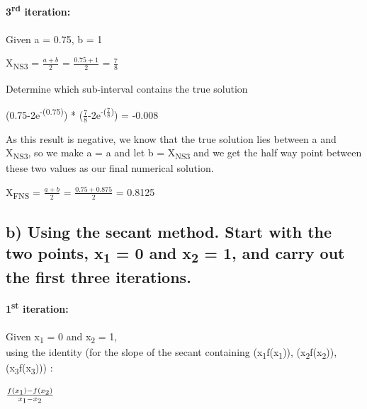 \documentclass{report}
\begin{document}
                \textbf{3\textsuperscript{rd} iteration:}\\\\

                Given a = 0.75, b = 1

                \begin{center}
                    X\textsubscript{NS3} = $\frac{a + b}{2}$ = $\frac{0.75 + 1}{2}$ = $\frac{7}{8}$
                \end{center}

                Determine which sub-interval contains the true solution

                \begin{center}
                    (0.75-2e\textsuperscript{-(0.75)}) * ($\frac{7}{8}$-2e\textsuperscript{-($\frac{7}{8}$)}) = -0.008
                \end{center}

                As this result is negative, we know that the true solution lies between a and X\textsubscript{NS3},
                so we make a = a and let b = X\textsubscript{NS3} and we get the half way point between these two values as our final numerical solution.

                \begin{center}
                    X\textsubscript{FNS} = $\frac{a + b}{2}$ = $\frac{0.75 + 0.875}{2}$ = 0.8125
                \end{center}



        \subsection*{b) Using the secant method. Start with the two points, x\textsubscript{1} = 0 and x\textsubscript{2} = 1, and carry out the first three iter­ations.}
            \textbf{1\textsuperscript{st} iteration:}\\\\
            Given x\textsubscript{1} = 0 and x\textsubscript{2} = 1,\\
            using the identity (for the slope of the secant containing (x\textsubscript{1}f(x\textsubscript{1})), 
            (x\textsubscript{2}f(x\textsubscript{2})), (x\textsubscript{3}f(x\textsubscript{3}))) : 

            \begin{center}
                $\frac{f(x\textsubscript{1}) - f(x\textsubscript{2})}{x\textsubscript{1} - x\textsubscript{2}}$
            \end{center}
\end{document}
